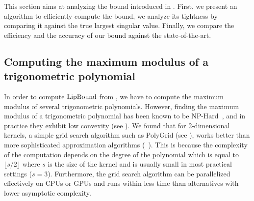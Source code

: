 This section aims at analyzing the bound introduced in .
First, we present an algorithm to efficiently compute the bound, we analyze its tightness by comparing it against the true largest singular value.
Finally, we compare the efficiency and the accuracy of our bound against the state-of-the-art. 

\subsection{Computing the maximum modulus of a trigonometric polynomial}
\label{subsection:ch5-computing_the_maximum_modulus_of_a_trigonometric_polynomial}

In order to compute $\mathrm{LipBound}$ from , we have to compute the maximum modulus of several trigonometric polynomials.
However, finding the maximum modulus of a trigonometric polynomial has been known to be NP-Hard~\cite{pfister2018bounding}, and in practice they exhibit low convexity (see ).
We found that for 2-dimensional kernels, a simple grid search algorithm such as PolyGrid (see ), works better than more sophisticated approximation algorithms (\eg ~\citet{green1999calculating,de2009finding}).
This is because the complexity of the computation depends on the degree of the polynomial which is equal to $\lfloor s / 2 \rfloor$ where $s$ is the size of the kernel and is usually small in most practical settings (\eg $s=3$).
Furthermore, the grid search algorithm can be parallelized effectively on CPUs or GPUs and runs within less time than alternatives with lower asymptotic complexity. 

